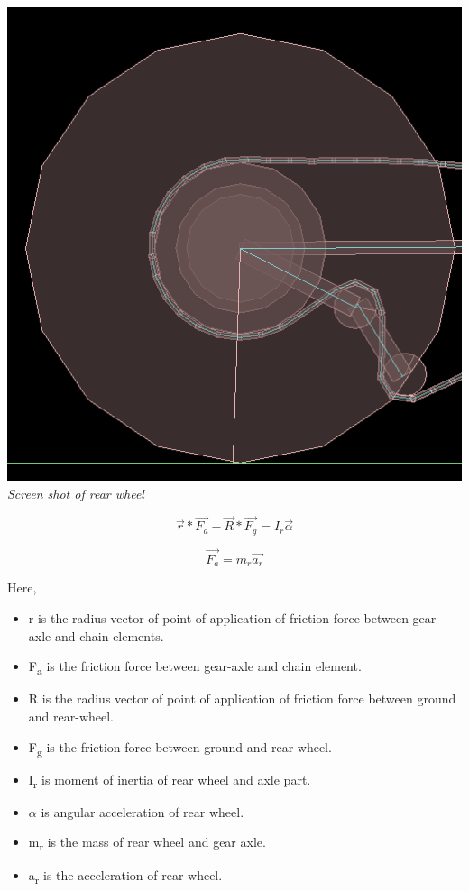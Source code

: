 \documentclass[11pt]{article}
\begin{document}
	\begin{center}
	 \includegraphics[scale = 0.4]{images/rear} \\
	  \emph{Screen shot of rear wheel} \\
	\end{center}

\begin{equation}
		\vec{r} * \vec{F_a} - \vec{R} * \vec{F_g}= I_r \vec\alpha
\end{equation}

\begin{equation}
		\vec{F_a} = m_r \vec{a_r}
\end{equation}

Here, 	
\begin{itemize}
\item r is the radius vector of point of application of friction force between gear-axle and chain elements.
\item F\textsubscript{a} is the friction force between gear-axle and chain element.
\item R is the radius vector of point of application of friction force between ground and rear-wheel.
\item F\textsubscript{g} is the friction force between ground and rear-wheel.
\item I\textsubscript{r} is moment of inertia of rear wheel and axle part.
\item $\alpha$ is angular acceleration of rear wheel.

\item m\textsubscript{r} is the mass of rear wheel and gear axle.
\item a\textsubscript{r} is the acceleration of rear wheel.
\end{itemize}
\end{document}
